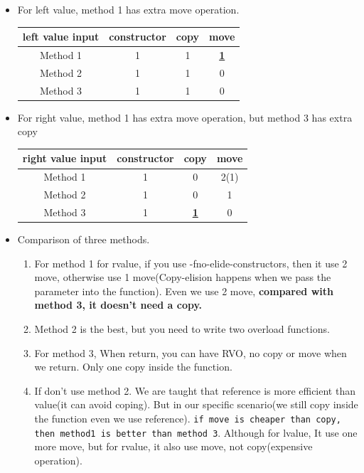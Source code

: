 \documentclass[a4paper,11pt,twoside]{book}
\begin{document}
\begin{itemize}
\item For left value, method 1 has extra move operation.

\begin{tabular}{|c|c|c|c|}
	\hline
	left value input	& constructor & copy & move  \\
	\hline
	Method 1 & 1 & 1 & \textbf{\underline{1}} \\
	\hline
	Method 2&  1& 1 & 0  \\
	\hline
	Method 3&  1&  1& 0 \\
	\hline
\end{tabular}

\item For right value, method 1 has extra move operation, but method 3 has extra copy

\begin{tabular}{|c|c|c|c|}
	\hline
	right value input	& constructor & copy & move  \\
	\hline
	Method 1 & 1 & 0 & 2(1)  \\
	\hline
	Method 2 & 1 & 0 & 1 \\
	\hline
	Method 3 & 1 & \textbf{\underline{1}} & 0 \\
	\hline
\end{tabular}


\item Comparison of three methods. 
\begin{enumerate}
	\item For method 1 for rvalue,  if you use -fno-elide-constructors, then it use 2 move, otherwise use 1 move(Copy-elision happens when we pass the parameter into the function). Even we use 2 move, \textbf{compared with method 3, it doesn't need a copy.}
	
	\item Method 2 is the best, but you need to write two overload functions.
	
	\item For method 3, When return, you can have RVO, no copy or move when we return. Only one copy inside the function.
	
	\item If don’t use method 2.  We are taught that reference is more efficient than value(it can avoid coping). But in our specific scenario(we still copy inside the function even we use reference). \texttt{if move is cheaper than copy, then method1 is better than method 3}. Although for lvalue, It use one more move, but for rvalue, it also use move, not copy(expensive operation).
	  

\end{enumerate}
\end{itemize}
\end{document}
